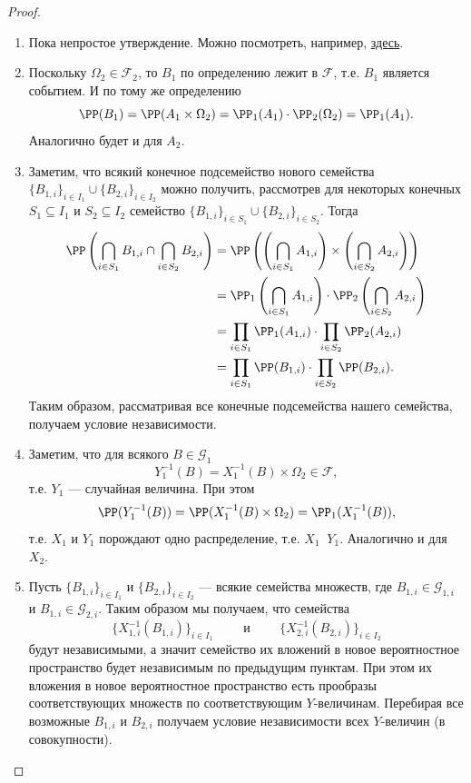 \documentclass[12pt,a4paper]{article}
\newcommand{\Deq}{\mathop{\stackrel{\mathcal{D}}{=}}}
\begin{document}
    \begin{proof}\ 
        \begin{enumerate}
            \item Пока непростое утверждение. Можно посмотреть, например, \href{https://teach-in.ru/file/synopsis/pdf/probability-theory-shabanov-M-2.pdf}{здесь}.
            \item Поскольку $\Omega_2 \in \mathcal{F}_2$, то $B_1$ по определению лежит в $\mathcal{F}$, т.е. $B_1$ является событием. И по тому же определению
                \[\PP(B_1) = \PP(A_1 \times \Omega_2) = \PP_1(A_1) \cdot \PP_2(\Omega_2) = \PP_1(A_1).\]
                Аналогично будет и для $A_2$.
            \item Заметим, что всякий конечное подсемейство нового семейства $\{B_{1,i}\}_{i \in I_1} \cup \{B_{2,i}\}_{i \in I_2}$ можно получить, рассмотрев для некоторых конечных $S_1 \subseteq I_1$ и $S_2 \subseteq I_2$ семейство $\{B_{1,i}\}_{i \in S_1} \cup \{B_{2,i}\}_{i \in S_2}$. Тогда
                \begin{align*}
                    \PP\left(\bigcap_{i \in S_1} B_{1, i} \cap \bigcap_{i \in S_2} B_{2, i}\right)
                    &= \PP\left(\left(\bigcap_{i \in S_1} A_{1, i}\right) \times \left(\bigcap_{i \in S_2} A_{2, i}\right)\right)\\
                    &= \PP_1\left(\bigcap_{i \in S_1} A_{1, i}\right) \cdot \PP_2\left(\bigcap_{i \in S_2} A_{2, i}\right)\\
                    &= \prod_{i \in S_1} \PP_1(A_{1, i}) \cdot \prod_{i \in S_2} \PP_2(A_{2, i})\\
                    &= \prod_{i \in S_1} \PP(B_{1, i}) \cdot \prod_{i \in S_2} \PP(B_{2, i}).
                \end{align*}
                Таким образом, рассматривая все конечные подсемейства нашего семейства, получаем условие независимости.
            \item Заметим, что для всякого $B \in \mathcal{G}_1$
                \[Y_1^{-1}(B) = X_1^{-1}(B) \times \Omega_2 \in \mathcal{F},\]
                т.е. $Y_1$ --- случайная величина. При этом
                \[\PP(Y_1^{-1}(B)) = \PP(X_1^{-1}(B) \times \Omega_2) = \PP_1(X_1^{-1}(B)),\]
                т.е. $X_1$ и $Y_1$ порождают одно распределение, т.е. $X_1 \Deq Y_1$. Аналогично и для $X_2$.
            \item Пусть $\{B_{1,i}\}_{i \in I_1}$ и $\{B_{2,i}\}_{i \in I_2}$ --- всякие семейства множеств, где $B_{1,i} \in \mathcal{G}_{1,i}$ и $B_{1,i} \in \mathcal{G}_{2,i}$. Таким образом мы получаем, что семейства
                \[\{X_{1,i}^{-1}(B_{1,i})\}_{i \in I_1} \qquad \text{ и } \qquad \{X_{2,i}^{-1}(B_{2,i})\}_{i \in I_2}\]
                будут независимыми, а значит семейство их вложений в новое вероятностное пространство будет независимым по предыдущим пунктам. При этом их вложения в новое вероятностное пространство есть прообразы соответствующих множеств по соответствующим $Y$-величинам. Перебирая все возможные $B_{1,i}$ и $B_{2,i}$ получаем условие независимости всех $Y$-величин (в совокупности).
        \end{enumerate}
    \end{proof}
\end{document}
